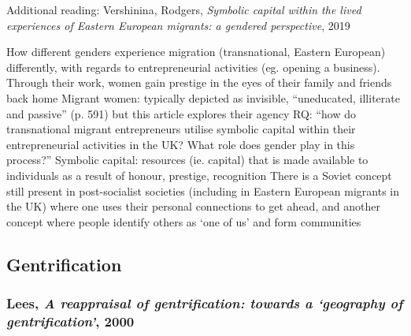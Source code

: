 \documentclass{article}
\begin{document}
Additional reading: Vershinina, Rodgers, \textit{Symbolic capital within the lived experiences of Eastern European migrants: a gendered perspective}, 2019

\begin{outline}
	\1 How different genders experience migration (transnational, Eastern European) differently, with regards to entrepreneurial activities (eg. opening a business). Through their work, women gain prestige in the eyes of their family and friends back home
	\1 Migrant women: typically depicted as invisible, ``uneducated, illiterate and passive'' (p. 591) but this article explores their agency
	\1 RQ: ``how do transnational migrant entrepreneurs utilise symbolic capital within their entrepreneurial activities in the UK? What role does gender play in this process?''
	\1 Symbolic capital: resources (ie. capital) that is made available to individuals as a result of honour, prestige, recognition
		\2 There is a Soviet concept still present in post-socialist societies (including in Eastern European migrants in the UK) where one uses their personal connections to get ahead, and another concept where people identify others as `one of us' and form communities
\end{outline}

\subsection{Gentrification}

\subsubsection{Lees, \textit{A reappraisal of gentrification: towards a `geography of gentrification'}, 2000} \parencite{lees2000reappraisal}
\end{document}
